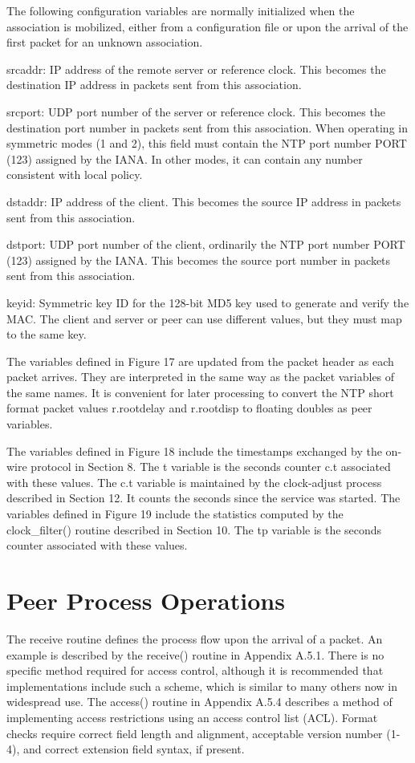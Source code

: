The following configuration variables are normally initialized when
the association is mobilized, either from a configuration file or
upon the arrival of the first packet for an unknown association.

srcaddr: IP address of the remote server or reference clock. This
becomes the destination IP address in packets sent from this
association.

srcport: UDP port number of the server or reference clock. This
becomes the destination port number in packets sent from this
association. When operating in symmetric modes (1 and 2), this field
must contain the NTP port number PORT (123) assigned by the IANA. In
other modes, it can contain any number consistent with local policy.

dstaddr: IP address of the client. This becomes the source IP
address in packets sent from this association.

dstport: UDP port number of the client, ordinarily the NTP port
number PORT (123) assigned by the IANA. This becomes the source port
number in packets sent from this association.

keyid: Symmetric key ID for the 128-bit MD5 key used to generate and
verify the MAC. The client and server or peer can use different
values, but they must map to the same key.

The variables defined in Figure 17 are updated from the packet header
as each packet arrives. They are interpreted in the same way as the
packet variables of the same names. It is convenient for later
processing to convert the NTP short format packet values r.rootdelay
and r.rootdisp to floating doubles as peer variables.

The variables defined in Figure 18 include the timestamps exchanged
by the on-wire protocol in Section 8. The t variable is the seconds
counter c.t associated with these values. The c.t variable is
maintained by the clock-adjust process described in Section 12. It
counts the seconds since the service was started. The variables
defined in Figure 19 include the statistics computed by the
clock\_filter() routine described in Section 10. The tp variable is
the seconds counter associated with these values.

\section{Peer Process Operations}

The receive routine defines the process flow upon the arrival of a
packet. An example is described by the receive() routine in
Appendix A.5.1. There is no specific method required for access
control, although it is recommended that implementations include such
a scheme, which is similar to many others now in widespread use. The
access() routine in Appendix A.5.4 describes a method of implementing
access restrictions using an access control list (ACL). Format
checks require correct field length and alignment, acceptable version
number (1-4), and correct extension field syntax, if present.

